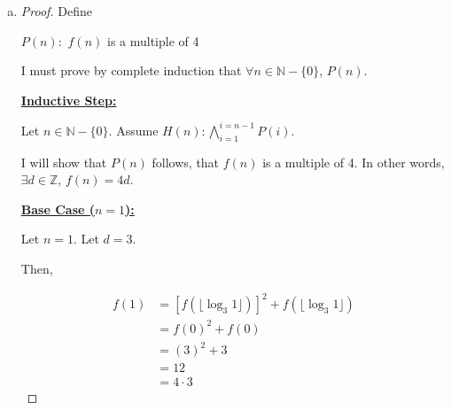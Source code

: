 \documentclass[12pt]{article}
\begin{document}
\begin{enumerate}[a.]



    \item

    \bigskip

    \begin{proof}
        Define

        \begin{center}
        $P(n):$ $f(n)$ is a multiple of 4
        \end{center}

        \bigskip

        I must prove by complete induction that $\forall n \in \mathbb{N} - \{0\}$, $P(n)$.

        \bigskip

        \underline{\textbf{Inductive Step:}}

        \bigskip

        Let $n \in \mathbb{N} - \{0\}$. Assume $H(n): \bigwedge\limits_{i=1}^{i=n-1} P(i)$.

        \bigskip

        I will show that $P(n)$ follows, that $f(n)$ is a multiple of 4. In other words,
        $\exists d \in \mathbb{Z}$, $f(n) = 4d$.

        \bigskip

        \underline{\textbf{Base Case ($n = 1$):}}

        \bigskip

        Let $n = 1$. Let $d = 3$.

        \bigskip

        Then,

        \setcounter{equation}{0}
        \begin{align}
            f(1) &= [f(\lfloor \log_3 1 \rfloor)]^2 + f(\lfloor \log_3 1  \rfloor)\\
            &= f(0)^2 + f(0)\\
            &= (3)^2 + 3\\
            &= 12\\
            &= 4 \cdot 3
        \end{align}


\end{proof}
\end{enumerate}
\end{document}
